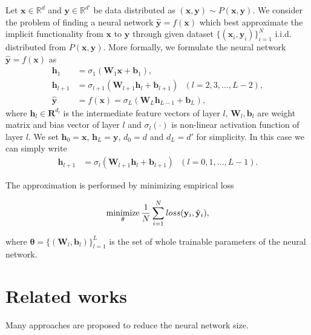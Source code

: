 \documentclass{article}
\newcommand{\minimize}{\mathop{\rm minimize}\limits}
\begin{document}
    Let $\mathbf{x} \in \mathbb{R}^{d}$ and $\mathbf{y} \in \mathbb{R}^{d'}$ be data distributed as $(\mathbf{x}, \mathbf{y}) \sim P(\mathbf{x}, \mathbf{y})$. 
    We consider the problem of finding a neural network $\hat{\mathbf{y}} = f(\mathbf{x})$ which best approximate the implicit functionality from $\mathbf{x}$ to $\mathbf{y}$ through given dataset $\{(\mathbf{x}_i, \mathbf{y}_i) \}_{i=1}^N$ i.i.d. distributed from $P(\mathbf{x}, \mathbf{y})$. More formally, we formulate the neural network $\hat{\mathbf{y}} = f(\mathbf{x})$ as 
    \begin{align}
      \mathbf{h}_1 &= {\sigma}_1 (\mathbf{W}_1 \mathbf{x} + \mathbf{b}_1), \nonumber \\
      \mathbf{h}_{l+1} &= {\sigma}_{l+1} (\mathbf{W}_{l+1} \mathbf{h}_{l} + \mathbf{b}_{l+1}) \ \ \ (l=2,3, \dots, L-2), \nonumber \\
      \hat{\mathbf{y}} &= f(\mathbf{x}) = {\sigma}_{L} (\mathbf{W}_{L} \mathbf{h}_{L-1} + \mathbf{b}_{L}),\nonumber      
    \end{align}
    where $\mathbf{h}_l \in \mathbf{R}^{d_l}$ is the intermediate feature vectors of layer $l$, $\mathbf{W}_l, \mathbf{b}_l$ are weight matrix and bias vector of layer $l$ and $\sigma_l(\cdot)$ is non-linear activation function of layer $l$. We set $\mathbf{h}_0 = \mathbf{x}$, $\mathbf{h}_{L} = \mathbf{y}$, $d_0=d$ and $d_L=d'$ for simplicity. In this case we can simply write
    \begin{align}
      \mathbf{h}_{l+1} &= {\sigma}_l (\mathbf{W}_{l+1} \mathbf{h}_l + \mathbf{b}_{l+1}) \ \ \ (l=0,1, \dots, L-1). \label{eq:nn}
    \end{align}

    The approximation is performed by minimizing empirical loss

    \begin{equation}
      \minimize_{\mathbf{\theta}} \frac{1}{N} \sum_{i=1}^N loss (\mathbf{y}_i, \hat{\mathbf{y}}_i), \label{original_objective}
    \end{equation}

    where $\mathbf{\theta}=\{(\mathbf{W}_l, \mathbf{b}_l)\}_{l=1}^L$ is the set of whole trainable parameters of the neural network.

    \section{Related works}
    \label{related_works}
    Many approaches are proposed to reduce the neural network size. 
    
\end{document}

